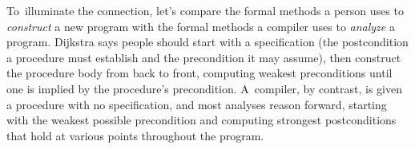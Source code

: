\documentclass[blockstyle,preprint,natbib,nocopyrightspace]{sigplanconf}
\begin{document}

To~illuminate the connection, let's compare the formal methods a 
person uses to 
\emph{construct} a new program with the formal methods a compiler uses
to \emph{analyze} a program.
Dijkstra says people should start with a specification (the postcondition a procedure
must establish and the precondition it may assume), then construct the
procedure body from back 
to front, computing weakest preconditions until one is implied by the
procedure's precondition. 
A~compiler, by contrast, is given a procedure with no specification,
and most analyses reason forward,  starting with the
weakest possible precondition and 
computing strongest postconditions that hold at various points throughout the program.
\end{document}
